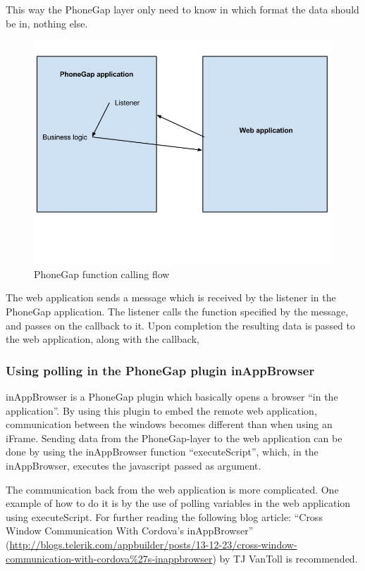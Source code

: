 This way the PhoneGap layer only need to know in which format the data should be in, nothing else. 
\begin{figure}[ht!]
    \centering
    \includegraphics[width=120mm,natwidth=800,natheight=600]{./img/phoneGapFlow.jpg}
    \caption{PhoneGap function calling flow \label{caption-phonegap-flow}}
\end{figure}
\newline
The web application sends a message which is received by the listener in the PhoneGap application. The listener calls the function specified by the message, and passes on the callback to it. Upon completion the resulting data is passed to the web application, along with the callback, 

\subsubsection{Using polling in the PhoneGap plugin inAppBrowser}

inAppBrowser is a PhoneGap plugin which basically opens a browser “in the application”. By using this plugin to embed the remote web application, communication between the windows becomes different than when using an iFrame. Sending data from the PhoneGap-layer to the web application can be done by using the inAppBrowser function “executeScript”, which, in the inAppBrowser, executes the javascript passed as argument.

The communication back from the web application is more complicated. One example of how to do it is by the use of polling variables in the web application using executeScript. For further reading the following blog article: “Cross Window Communication With Cordova’s inAppBrowser” (\url{http://blogs.telerik.com/appbuilder/posts/13-12-23/cross-window-communication-with-cordova\%27s-inappbrowser}) by TJ VanToll is recommended. 

